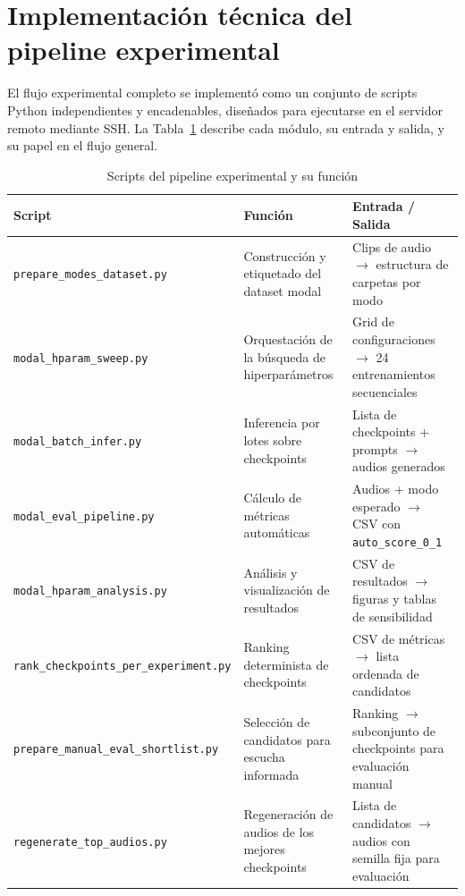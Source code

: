 \documentclass[%
    school=etsisi,%
    type=pfg,%
    degree=61CD,%
]{upm-report}
\begin{document}
\section{Implementaci\'on t\'ecnica del pipeline experimental}
\label{s:implementacion-pipeline}

El flujo experimental completo se implement\'o como un conjunto de scripts Python independientes y encadenables, dise\~nados para ejecutarse en el servidor remoto mediante SSH. La Tabla~\ref{tab:scripts-pipeline} describe cada m\'odulo, su entrada y salida, y su papel en el flujo general.

\begin{table}[htbp]
    \centering
    \caption{Scripts del pipeline experimental y su funci\'on}
    \label{tab:scripts-pipeline}
    \small
    \begin{tabular}{p{5.2cm}p{3.3cm}p{4.5cm}}
        \toprule
        \textbf{Script} & \textbf{Funci\'on} & \textbf{Entrada / Salida} \\
        \midrule
        \texttt{prepare\_modes\_dataset.py}
            & Construcci\'on y etiquetado del dataset modal
            & Clips de audio $\to$ estructura de carpetas por modo \\
        \texttt{modal\_hparam\_sweep.py}
            & Orquestaci\'on de la b\'usqueda de hiperpar\'ametros
            & Grid de configuraciones $\to$ 24 entrenamientos secuenciales \\
        \texttt{modal\_batch\_infer.py}
            & Inferencia por lotes sobre checkpoints
            & Lista de checkpoints + prompts $\to$ audios generados \\
        \texttt{modal\_eval\_pipeline.py}
            & C\'alculo de m\'etricas autom\'aticas
            & Audios + modo esperado $\to$ CSV con \texttt{auto\_score\_0\_1} \\
        \texttt{modal\_hparam\_analysis.py}
            & An\'alisis y visualizaci\'on de resultados
            & CSV de resultados $\to$ figuras y tablas de sensibilidad \\
        \texttt{rank\_checkpoints\_per\_experiment.py}
            & Ranking determinista de checkpoints
            & CSV de m\'etricas $\to$ lista ordenada de candidatos \\
        \texttt{prepare\_manual\_eval\_shortlist.py}
            & Selecci\'on de candidatos para escucha informada
            & Ranking $\to$ subconjunto de checkpoints para evaluaci\'on manual \\
        \texttt{regenerate\_top\_audios.py}
            & Regeneraci\'on de audios de los mejores checkpoints
            & Lista de candidatos $\to$ audios con semilla fija para evaluaci\'on \\
        \bottomrule
    \end{tabular}
\end{table}
\end{document}
